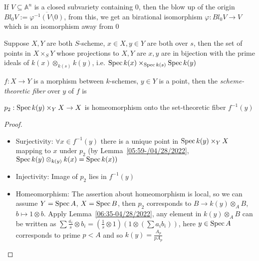 \documentclass[main]{subfiles}
\begin{document}
\begin{definition}
If $V\subseteq\mathbb A^n$ is a closed subvariety containing $0$, then the blow up of the origin $Bl_0V:=\overline{\varphi^{-1}(V\setminus0)}$, from this, we get an birational isomorphism $\varphi:Bl_0V\to V$ which is an isomorphism away from $0$
\end{definition}

\begin{lemma}\label{05:59-/04/28/2022}
Suppose $X,Y$ are both $S$-scheme, $x\in X,y\in Y$ are both over $s$, then the set of points in $X\times_S Y$ whose projections to $X,Y$ are $x,y$ are in bijection with the prime ideals of $k(x)\otimes_{k(s)} k(y)$, i.e. $\operatorname{Spec} k(x)\times_{\operatorname{Spec} k(s)}\operatorname{Spec} k(y)$
\end{lemma}

\begin{definition}
$f:X\to Y$ is a morphism between $k$-schemes, $y\in Y$ is a point, then the \textit{scheme-theoretic fiber} over $y$ of $f$ is
\begin{center}
\end{center}
\end{definition}

\begin{proposition}
$p_2:\operatorname{Spec} k(y)\times_YX\to X$ is homeomorphism onto the set-theoretic fiber $f^{-1}(y)$
\end{proposition}

\begin{proof}
\begin{itemize}
\item \textsf{Surjectivity}: $\forall x\in f^{-1}(y)$ there is a unique point in $\operatorname{Spec} k(y)\times_YX$ mapping to $x$ under $p_2$ (by Lemma~\ref{05:59-/04/28/2022}, $\operatorname{Spec} k(y)\otimes_{k(y)}k(x)=\operatorname{Spec} k(x))$
\item \textsf{Injectivity}: Image of $p_2$ lies in $f^{-1}(y)$
\item \textsf{Homeomorphism}: The assertion about homeomorphism is local, so we can assume $Y=\operatorname{Spec} A$, $X=\operatorname{Spec} B$, then $p_2$ corresponds to $B\to k(y)\otimes_A B$, $b\mapsto 1\otimes b$. Apply Lemma~\ref{06:35-04/28/2022}, any element in $k(y)\otimes_AB$ can be written as $\sum\frac{\overline{a_i}}{\overline{s}}\otimes b_i=(\frac{1}{\overline{s}}\otimes1)(1\otimes(\sum a_ib_i))$, here $y\in\operatorname{Spec} A$ corresponds to prime $p<A$ and so $k(y)=\frac{A_p}{pA_p}$
\end{itemize}
\end{proof}
\end{document}
